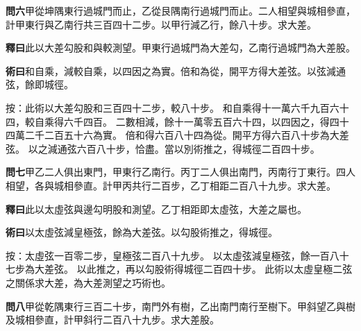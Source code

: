\documentclass[12pt,a4paper]{article}
\begin{document}
\vspace{0.5em}

\noindent\textbf{問六}\quad 甲從坤隅東行過城門而止，乙從艮隅南行過城門而止。二人相望與城相參直，計甲東行與乙南行共三百四十二步。以甲行減乙行，餘八十步。求大差。

\vspace{0.3em}

\noindent\textbf{釋曰}\quad 此以大差勾股和與較測望。甲東行過城門為大差勾，乙南行過城門為大差股。

\vspace{0.3em}

\noindent\textbf{術曰}\quad 和自乘，減較自乘，以四因之為實。倍和為從，開平方得大差弦。以弦減通弦，餘即城徑。

\vspace{0.3em}

\noindent
按：此術以大差勾股和三百四十二步，較八十步。
和自乘得十一萬六千九百六十四，較自乘得六千四百。
二數相減，餘十一萬零五百六十四，以四因之，得四十四萬二千二百五十六為實。
倍和得六百八十四為從。開平方得六百八十步為大差弦。
以之減通弦六百八十步，恰盡。當以別術推之，得城徑二百四十步。

\vspace{0.5em}

\noindent\textbf{問七}\quad 甲乙二人俱出東門，甲東行乙南行。丙丁二人俱出南門，丙南行丁東行。四人相望，各與城相參直。計甲丙共行二百步，乙丁相距二百八十九步。求大差。

\vspace{0.3em}

\noindent\textbf{釋曰}\quad 此以太虛弦與邊勾明股和測望。乙丁相距即太虛弦，大差之屬也。

\vspace{0.3em}

\noindent\textbf{術曰}\quad 以太虛弦減皇極弦，餘為大差弦。以勾股術推之，得城徑。

\vspace{0.3em}

\noindent
按：太虛弦一百零二步，皇極弦二百八十九步。
以太虛弦減皇極弦，餘一百八十七步為大差弦。
以此推之，再以勾股術得城徑二百四十步。
此術以太虛皇極二弦之關係求大差，為大差測望之巧術也。

\vspace{0.5em}

\noindent\textbf{問八}\quad 甲從乾隅東行三百二十步，南門外有樹，乙出南門南行至樹下。甲斜望乙與樹及城相參直，計甲斜行二百八十九步。求大差股。

\vspace{0.3em}
\end{document}
